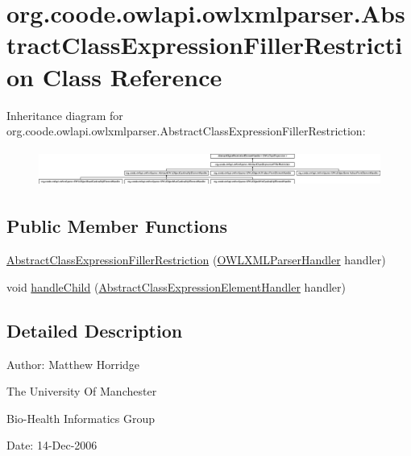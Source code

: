 \hypertarget{classorg_1_1coode_1_1owlapi_1_1owlxmlparser_1_1_abstract_class_expression_filler_restriction}{\section{org.\-coode.\-owlapi.\-owlxmlparser.\-Abstract\-Class\-Expression\-Filler\-Restriction Class Reference}
\label{classorg_1_1coode_1_1owlapi_1_1owlxmlparser_1_1_abstract_class_expression_filler_restriction}
}
Inheritance diagram for org.\-coode.\-owlapi.\-owlxmlparser.\-Abstract\-Class\-Expression\-Filler\-Restriction\-:\begin{figure}[H]
\begin{center}
\leavevmode
\includegraphics[height=1.212121cm]{classorg_1_1coode_1_1owlapi_1_1owlxmlparser_1_1_abstract_class_expression_filler_restriction}
\end{center}
\end{figure}
\subsection*{Public Member Functions}
\begin{DoxyCompactItemize}
\item 
\hyperlink{classorg_1_1coode_1_1owlapi_1_1owlxmlparser_1_1_abstract_class_expression_filler_restriction_a24690ab5a80f0dff178e6555e363a373}{Abstract\-Class\-Expression\-Filler\-Restriction} (\hyperlink{classorg_1_1coode_1_1owlapi_1_1owlxmlparser_1_1_o_w_l_x_m_l_parser_handler}{O\-W\-L\-X\-M\-L\-Parser\-Handler} handler)
\item 
void \hyperlink{classorg_1_1coode_1_1owlapi_1_1owlxmlparser_1_1_abstract_class_expression_filler_restriction_aa404f46aac7278622128001033124be4}{handle\-Child} (\hyperlink{classorg_1_1coode_1_1owlapi_1_1owlxmlparser_1_1_abstract_class_expression_element_handler}{Abstract\-Class\-Expression\-Element\-Handler} handler)
\end{DoxyCompactItemize}


\subsection{Detailed Description}
Author\-: Matthew Horridge\par
 The University Of Manchester\par
 Bio-\/\-Health Informatics Group\par
 Date\-: 14-\/\-Dec-\/2006\par
\par
 

